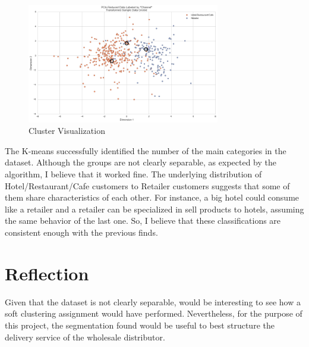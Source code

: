 \documentclass[a4paper]{article}
\begin{document}
\begin{figure}[ht!]
\centering
\includegraphics[width=0.75\textwidth]{figures/clustering_2.png}
\caption{\label{fig:clustering_2}Cluster Visualization}
\end{figure}

The K-means successfully identified the number of the main categories in the dataset. Although the groups are not clearly separable, as expected by the algorithm, I believe that it worked fine. The underlying distribution of Hotel/Restaurant/Cafe customers to Retailer customers suggests that some of them share characteristics of each other. For instance, a big hotel could consume like a retailer and a retailer can be specialized in sell products to hotels, assuming the same behavior of the last one. So, I believe that these classifications are consistent enough with the previous finds.


\section{Reflection}
\label{sec:reflection}
Given that the dataset is not clearly separable, would be interesting to see how a soft clustering assignment would have performed. Nevertheless, for the purpose of this project, the segmentation found would be useful to best structure the delivery service of the wholesale distributor.






\end{document}
